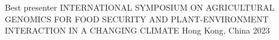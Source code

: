 



\begin{cvhonors}

  \cvhonor
    {Best presenter} %
    {INTERNATIONAL SYMPOSIUM ON AGRICULTURAL GENOMICS FOR FOOD SECURITY AND PLANT-ENVIRONMENT INTERACTION IN A CHANGING CLIMATE} %
    {Hong Kong, China} %
    {2023} %

%
%
%

\end{cvhonors}




%
%
%
%

